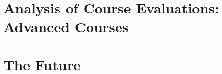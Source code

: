 \documentclass[../../main.tex]{subfiles}
\begin{document}
\begin{flushleft}

\end{flushleft}

\section{Analysis of Course Evaluations: Advanced Courses}
\label{sec:adv_eval}

\begin{flushleft}

\end{flushleft}

\section{The Future}
\label{sec:future_teaching}

\begin{flushleft}

\end{flushleft}
\end{document}
